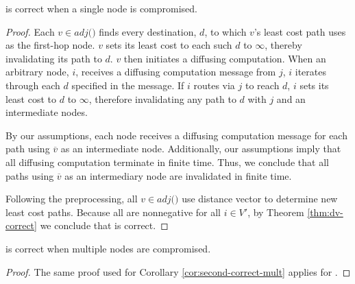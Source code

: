 \begin{corollary}
\label{cor:purge-correct-single}
\purge is correct when a single node is compromised.
\end{corollary}
\begin{proof}
Each $v \in adj($\bads$)$ finds every destination, $d$, to which $v$'s least cost path 
uses \bad as the first-hop node. $v$ sets its least cost to each such $d$ to $\infty$, thereby invalidating its path to $d$.  
$v$ then initiates a diffusing computation. When an arbitrary node, $i$, receives a diffusing computation message from $j$, $i$ iterates 
through each $d$ specified in the message. If
$i$ routes via $j$ to reach $d$, $i$ sets its least cost to $d$ to $\infty$, therefore invalidating any path to $d$ with $j$ and  
\bad an intermediate nodes.  

By our assumptions, each node receives a diffusing computation message for each path using $\overline{v}$ as an intermediate node.  Additionally, our assumptions imply that all diffusing computation terminate in finite time. 
Thus, we conclude that all paths using $\overline{v}$ as an intermediary node are invalidated in finite time. 

Following the preprocessing, all $v \in adj($\bads$)$ use
distance vector to determine new least cost paths. Because all \dmatrixi are nonnegative for all $i \in V'$, by Theorem \ref{thm:dv-correct} we conclude that \purge is correct. 
\end{proof}

\begin{corollary}
\label{cor:purge-correct-mult}
\purge is correct when multiple nodes are compromised.
\end{corollary}
\begin{proof}
The same proof used for Corollary \ref{cor:second-correct-mult} applies for \purges.
\end{proof}

